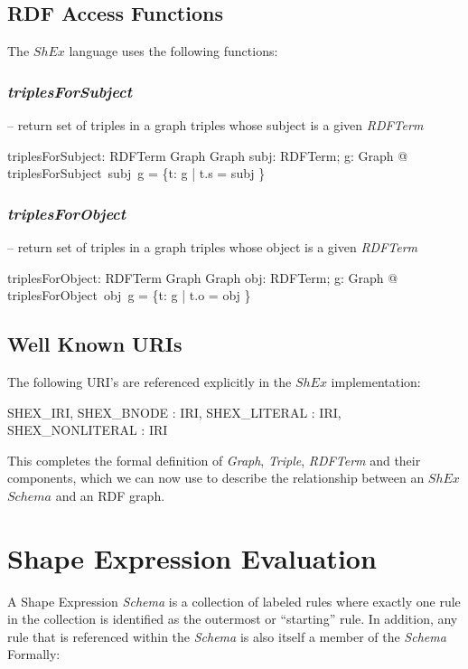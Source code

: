\documentclass[fuzz]{llncs}
\def\zc{\textit}
\begin{document}
\subsection{RDF Access Functions}

The $ShEx$ language uses the following functions:

\subsubsection{\zc{triplesForSubject}} -- return set of triples in a graph triples whose subject is a given \zc{RDFTerm}
\begin{gendef}
   triplesForSubject: RDFTerm \fun Graph \fun Graph
\where
   \forall subj: RDFTerm; g: Graph @ triplesForSubject~subj~g = \{t: g | t.s = subj \}
\end{gendef}

\subsubsection{\zc{triplesForObject}} -- return set of triples in a graph triples whose object is a given \zc{RDFTerm}
\begin{gendef}
   triplesForObject: RDFTerm \fun Graph \fun Graph
\where
   \forall obj: RDFTerm; g: Graph @ triplesForObject~obj~g = \{t: g | t.o = obj \}
\end{gendef}

\subsection{Well Known URIs}

The following URI's are referenced explicitly in the $ShEx$ implementation:

\begin{axdef}
SHEX\_IRI, SHEX\_BNODE : IRI, SHEX\_LITERAL : IRI, SHEX\_NONLITERAL : IRI
\end{axdef}

This completes the formal definition of \zc{Graph}, \zc{Triple}, \zc{RDFTerm} and their components, which we can now use to describe the relationship between an $ShEx$ $Schema$ and an RDF graph.

\section{Shape Expression Evaluation}
A Shape Expression \zc{Schema} is a collection of labeled rules where exactly one rule in the collection is identified as the outermost or ``starting'' rule. In addition, any rule 
that is referenced within the \zc{Schema} is also itself a member of the \zc{Schema} Formally:
\end{document}
